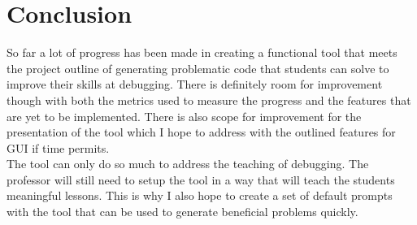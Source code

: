 \documentclass[12pt]{extarticle}
\begin{document}
\newpage
\section{Conclusion}

So far a lot of progress has been made in creating a functional tool that meets the project outline of generating problematic code that students can solve to improve their skills at debugging. There is definitely room for improvement though with both the metrics used to measure the progress and the features that are yet to be implemented. There is also scope for improvement for the presentation of the tool which I hope to address with the outlined features for GUI if time permits.\\
The tool can only do so much to address the teaching of debugging. The professor will still need to setup the tool in a way that will teach the students meaningful lessons. This is why I also hope to create a set of default prompts with the tool that can be used to generate beneficial problems quickly.
\end{document}
